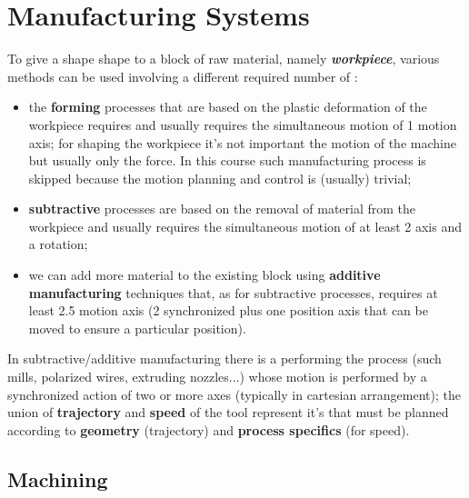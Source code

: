 \chapter{Manufacturing Systems}
	
	To give a shape shape to a block of raw material, namely \textit{\textbf{workpiece}}, various methods can be used involving a different required number of :
	\begin{itemize}
		\item the \textbf{forming} processes that are based on the plastic deformation of the workpiece requires and usually requires the simultaneous motion of 1 motion axis; for shaping the workpiece it's not important the motion of the machine but usually only the force. In this course such manufacturing process is skipped because the motion planning and control is (usually) trivial;
		\item \textbf{subtractive} processes are based on the removal of material from the workpiece and usually requires the simultaneous motion of at least 2 axis and a rotation;
		\item we can add more material to the existing block using \textbf{additive manufacturing} techniques that, as for subtractive processes, requires at least 2.5 motion axis (2 synchronized plus one position axis that can be moved to ensure a particular position).
	\end{itemize}
	In subtractive/additive manufacturing there is a  performing the process (such mills, polarized wires, extruding nozzles...) whose motion is performed by a synchronized action of two or more axes (typically in cartesian arrangement); the union of \textbf{trajectory} and \textbf{speed} of the tool represent it's  that must be planned according to \textbf{geometry} (trajectory) and \textbf{process specifics} (for speed).
	
	
\section{Machining}
	
